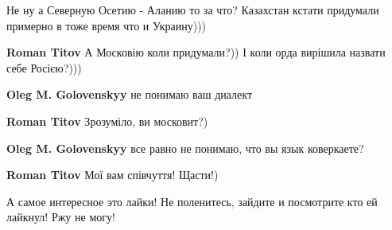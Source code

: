 \begin{itemize}
Не ну а Северную Осетию - Аланию то за что? Казахстан кстати придумали примерно в тоже время что и Украину)))

\begin{itemize}
 
\textbf{Roman Titov} А Московію коли придумали?)) І коли орда вирішила назвати себе Росією?)))

 
\textbf{Oleg M. Golovenskyy} не понимаю ваш диалект

 
\textbf{Roman Titov} Зрозуміло, ви московит?)

 
\textbf{Oleg M. Golovenskyy} все равно не понимаю, что вы язык коверкаете?

 
\textbf{Roman Titov} Мої вам співчуття! Щасти!)
\end{itemize}

 
А самое интересное это лайки! Не поленитесь, зайдите и посмотрите кто ей лайкнул! Ржу не могу!

 


\end{itemize}
